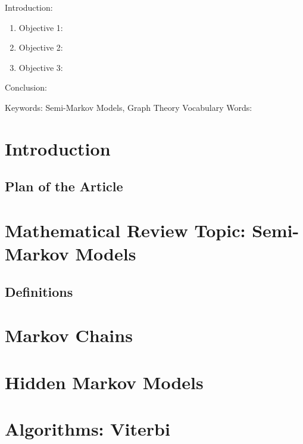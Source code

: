 
\twocolumn
\scriptsize
\begin{frontmatter}
		\title{}
		\author{}
		\address{The Mathematical Learning Space}
\end{frontmatter}	

Introduction:
\begin{enumerate}
\item Objective 1:
\item Objective 2:
\item Objective 3:
\end{enumerate}
Conclusion:

Keywords: Semi-Markov Models, Graph Theory
Vocabulary Words:

\section{Introduction}

\subsection{Plan of the Article}


\section{Mathematical Review Topic: Semi-Markov Models}

\subsection{Definitions}


\section{Markov Chains}

\section{Hidden Markov Models}

\section{Algorithms: Viterbi}


